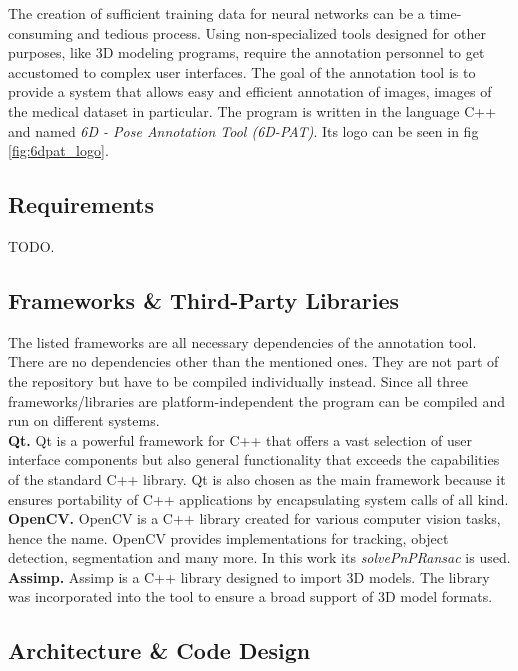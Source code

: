 The creation of sufficient training data for neural networks can be a time-consuming and tedious process. Using non-specialized tools designed for other purposes, like 3D modeling programs, require the annotation personnel to get accustomed to complex user interfaces. The goal of the annotation tool is to provide a system that allows easy and efficient annotation of images, images of the medical dataset in particular. The program is written in the language C++ and named \textit{6D - Pose Annotation Tool (6D-PAT)}. Its logo can be seen in fig \ref{fig:6dpat_logo}.

\subsection{Requirements}

TODO.

\subsection{Frameworks \& Third-Party Libraries}

The listed frameworks are all necessary dependencies of the annotation tool. There are no dependencies other than the mentioned ones. They are not part of the repository but have to be compiled individually instead. Since all three frameworks/libraries are platform-independent the program can be compiled and run on different systems. \\

\noindent\textbf{Qt.} Qt \cite{qt} is a powerful framework for C++ that offers a vast selection of user interface components but also general functionality that exceeds the capabilities of the standard C++ library. Qt is also chosen as the main framework because it ensures portability of C++ applications by encapsulating system calls of all kind. \\

\noindent\textbf{OpenCV.} OpenCV \cite{opencv} is a C++ library created for various computer vision tasks, hence the name. OpenCV provides implementations for tracking, object detection, segmentation and many more. In this work its \textit{solvePnPRansac} is used. \\

\noindent\textbf{Assimp.} Assimp \cite{assimp} is a C++ library designed to import 3D models. The library was incorporated into the tool to ensure a broad support of 3D model formats.

\subsection{Architecture \& Code Design}

